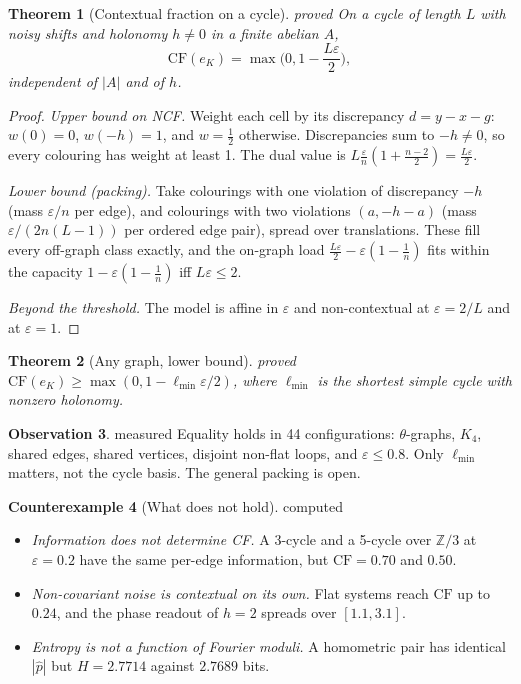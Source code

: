 \documentclass[11pt]{article}
\newtheorem{theorem}{Theorem}[section]
\theoremstyle{definition}
\newtheorem{observation}[theorem]{Observation}
\newtheorem{counterexample}[theorem]{Counterexample}
\theoremstyle{remark}
\newcommand{\Z}{\mathbb{Z}}
\newcommand{\CF}{\mathrm{CF}}
\newcommand{\lmin}{\ell_{\min}}
\newcommand{\st}[1]{\textsf{\small\color{gray}#1}}
\begin{document}
\begin{theorem}[Contextual fraction on a cycle]\label{thm:cfcycle}\st{proved}
On a cycle of length $L$ with noisy shifts and holonomy $h\ne0$ in a finite abelian $A$,
\[
\CF(e_K)=\max\!\Big(0,1-\frac{L\varepsilon}{2}\Big),
\]
independent of $|A|$ and of $h$.
\end{theorem}
\begin{proof}
\emph{Upper bound on NCF.} Weight each cell by its discrepancy $d=y-x-g$: $w(0)=0$, $w(-h)=1$, and $w=\tfrac12$ otherwise. Discrepancies sum to $-h\ne0$, so every colouring has weight at least 1. The dual value is $L\tfrac\varepsilon n(1+\tfrac{n-2}2)=\tfrac{L\varepsilon}2$.

\emph{Lower bound (packing).} Take colourings with one violation of discrepancy $-h$ (mass $\varepsilon/n$ per edge), and colourings with two violations $(a,-h-a)$ (mass $\varepsilon/(2n(L-1))$ per ordered edge pair), spread over translations. These fill every off-graph class exactly, and the on-graph load $\tfrac{L\varepsilon}2-\varepsilon(1-\tfrac1n)$ fits within the capacity $1-\varepsilon(1-\tfrac1n)$ iff $L\varepsilon\le2$.

\emph{Beyond the threshold.} The model is affine in $\varepsilon$ and non-contextual at $\varepsilon=2/L$ and at $\varepsilon=1$.
\end{proof}
\begin{theorem}[Any graph, lower bound]\label{thm:girth}\st{proved}
$\CF(e_K)\ge\max(0,1-\lmin\varepsilon/2)$, where $\lmin$ is the shortest simple cycle with nonzero holonomy.
\end{theorem}
\begin{observation}\label{res:auto14}\st{measured}
Equality holds in 44 configurations: $\theta$-graphs, $K_4$, shared edges, shared vertices, disjoint non-flat loops, and $\varepsilon\le0.8$. Only $\lmin$ matters, not the cycle basis. The general packing is \st{open}.
\end{observation}
\begin{counterexample}[What does not hold]\label{ce:info}\st{computed}
\begin{itemize}
  \item \emph{Information does not determine CF.} A 3-cycle and a 5-cycle over $\Z/3$ at $\varepsilon=0.2$ have the same per-edge information, but $\CF=0.70$ and $0.50$.
  \item \emph{Non-covariant noise is contextual on its own.} Flat systems reach $\CF$ up to $0.24$, and the phase readout of $h=2$ spreads over $[1.1,3.1]$.
  \item \emph{Entropy is not a function of Fourier moduli.} A homometric pair has identical $|\hat p|$ but $H=2.7714$ against $2.7689$ bits.
\end{itemize}
\end{counterexample}
\end{document}
